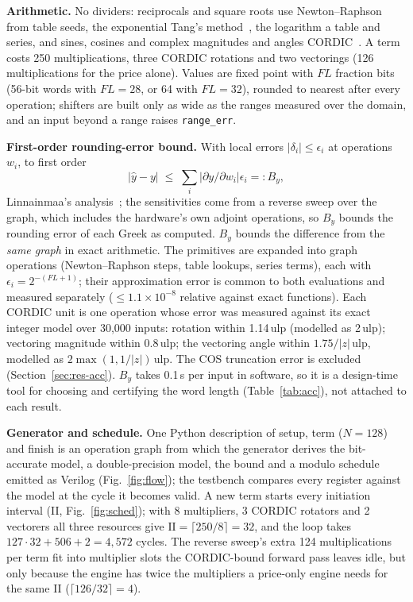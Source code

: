 \documentclass[conference]{IEEEtran}
\begin{document}
\textbf{Arithmetic.} No dividers: reciprocals and square roots use Newton--Raphson from table seeds,
the exponential Tang's method~\cite{tang}, the logarithm a table and series, and sines, cosines and
complex magnitudes and angles CORDIC~\cite{volder}. A term costs 250 multiplications, three CORDIC
rotations and two vectorings (126 multiplications for the price alone). Values are fixed point with
$FL$ fraction bits (56-bit words with $FL=28$, or 64 with $FL=32$), rounded to nearest after every
operation; shifters are built only as wide as the ranges measured over the domain, and an input
beyond a range raises \texttt{range\_err}.

\textbf{First-order rounding-error bound.}
\label{sec:bound}
With local errors $|\delta_i|\le\epsilon_i$ at operations $w_i$, to first order
\begin{equation}
|\hat y - y| \;\le\; \sum_i \left|\partial y/\partial w_i\right| \epsilon_i =: B_y ,
\label{eq:bound}
\end{equation}
Linnainmaa's analysis~\cite{linnainmaa}; the sensitivities come from a reverse sweep over the graph,
which includes the hardware's own adjoint operations, so $B_y$ bounds the rounding error of each
Greek as computed. $B_y$ bounds the difference from the \emph{same graph} in exact arithmetic. The
primitives are expanded into graph operations (Newton--Raphson steps, table lookups, series terms),
each with $\epsilon_i = 2^{-(FL+1)}$; their approximation error is common to both evaluations and
measured separately ($\le1.1\times10^{-8}$ relative against exact functions). Each CORDIC unit is one
operation whose error was measured against its exact integer model over 30,000 inputs: rotation
within 1.14\,ulp (modelled as 2\,ulp); vectoring magnitude within 0.8\,ulp; the vectoring angle
within $1.75/|z|$\,ulp, modelled as $2\max(1,1/|z|)$\,ulp. The COS truncation error is excluded
(Section~\ref{sec:res-acc}). $B_y$ takes 0.1\,s per input in software, so it is a design-time tool
for choosing and certifying the word length (Table~\ref{tab:acc}), not attached to each result.

\textbf{Generator and schedule.} One Python description of setup, term ($N=128$) and finish is an
operation graph from which the generator derives the bit-accurate model, a double-precision model,
the bound and a modulo schedule~\cite{rau} emitted as Verilog (Fig.~\ref{fig:flow}); the testbench
compares every register against the model at the cycle it becomes valid. A new term starts every
initiation interval (II, Fig.~\ref{fig:sched}); with 8 multipliers, 3 CORDIC rotators and 2 vectorers
all three resources give $\mathrm{II}=\lceil 250/8\rceil=32$, and the loop takes $127\cdot32+506+2=4{,}572$
cycles. The reverse sweep's extra 124 multiplications per term fit into multiplier slots the
CORDIC-bound forward pass leaves idle, but only because the engine has twice the multipliers a
price-only engine needs for the same II ($\lceil126/32\rceil=4$).
\end{document}
